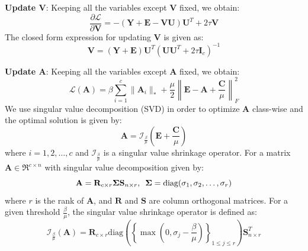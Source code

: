 \noindent\textbf{Update $\mathbf{V}$}: Keeping all the variables except $\mathbf{V}$ fixed, we obtain:
\begin{equation}
    \label{eq: LRDRR_Lag_for_V}
    \frac{\partial \mathcal{L}}{\partial \mathbf{V}}  = - (\mathbf{Y} + \mathbf{E} - \mathbf{V}\mathbf{U}) \mathbf{U}^{T} + 2 \tau \mathbf{V}
\end{equation}
%
The closed form expression for updating $\mathbf{V}$ is given as:
%
\begin{equation}
    \label{eq: LRDRR_Define_V}
    \mathbf{V} = (\mathbf{Y} + \mathbf{E}) \mathbf{U}^{T} (\mathbf{U} \mathbf{U}^{T} + 2 \tau \mathbf{I}_{c})^{-1} 
\end{equation}

\noindent\textbf{Update $\mathbf{A}$}: Keeping all the variables except $\mathbf{A}$ fixed, we obtain:
%
\begin{equation*}
        \label{eq: LRDRR_Lag_for_A} 
        \mathcal{L}(\mathbf{A})  = \beta \sum_{i=1}^{c} \| \mathbf{A}_{i} \|_{*} + \frac{\mu}{2} \left\| \mathbf{E} - \mathbf{A} + \frac{\mathbf{C}}{\mu} \right\|_{F}^{2} 
\end{equation*}
%
We use singular value decomposition (SVD) in order to optimize $\mathbf{A}$ class-wise and the optimal solution is given by: 
%
\begin{equation}
    \label{eq: LRDRR_Define_A}
        \mathbf{A}  = \mathcal{I}_{\frac{\beta}{\mu}} \left(\mathbf{E} + \frac{\mathbf{C}}{\mu}\right) 
\end{equation}
%
where $i=1,2,\dots,c$ and $\mathcal{I}_{\frac{\beta}{\mu}}$ is a singular value shrinkage operator. For a matrix $\mathbf{A} \in \Re^{c \times n}$ with singular value decomposition given by:
%
\begin{equation*}
    \label{eq: SVD_A}
    \mathbf{A} = \mathbf{R}_{c \times r} \mathbf{\Sigma} \mathbf{S}_{n \times r} , \enskip \mathbf{\Sigma} = \text{diag}(\sigma_{1}, \sigma_{2}, \dots, \sigma_{r})
\end{equation*}
%
where $r$ is the rank of $\mathbf{A}$, and $\mathbf{R}$ and $\mathbf{S}$ are column orthogonal matrices. For a given threshold $\frac{\beta}{\mu}$, the singular value shrinkage operator is defined as:
%
\begin{equation*}
 \mathcal{I}_{\frac{\beta}{\mu}}(\mathbf{A}) = \mathbf{R}_{c \times r} \text{diag}\left(\left\{\max\left(0, \sigma_{j} - \frac{\beta}{\mu}\right)\right\}_{1 \leq j \leq r}\right) \mathbf{S}^{T}_{n \times r}   
\end{equation*}

